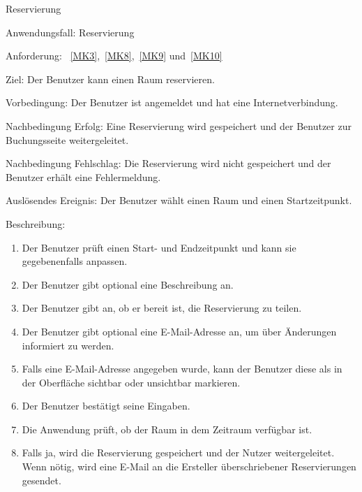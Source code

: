 \begin{function}{30}{Reservierung}
    \item[Anwendungsfall:] Reservierung
    \item[Anforderung:]~\ref{MK3},~\ref{MK8},~\ref{MK9} und~\ref{MK10}
    \item[Ziel:] Der Benutzer kann einen Raum reservieren.
    \item[Vorbedingung:] Der Benutzer ist angemeldet und hat eine Internetverbindung.
    \item[Nachbedingung Erfolg:] Eine Reservierung wird gespeichert und der Benutzer zur Buchungsseite weitergeleitet.
    \item[Nachbedingung Fehlschlag:] Die Reservierung wird nicht gespeichert und der Benutzer erhält eine Fehlermeldung.
    \item[Auslösendes Ereignis:] Der Benutzer wählt einen Raum und einen Startzeitpunkt.
    \item[Beschreibung:] ~
    \begin{enumerate}
        \item Der Benutzer prüft einen Start- und Endzeitpunkt und kann sie gegebenenfalls anpassen.
        \item Der Benutzer gibt optional eine Beschreibung an.
        \item Der Benutzer gibt an, ob er bereit ist, die Reservierung zu teilen.
        \item Der Benutzer gibt optional eine E-Mail-Adresse an, um über Änderungen informiert zu werden.
        \item Falls eine E-Mail-Adresse angegeben wurde, kann der Benutzer diese als in der Oberfläche sichtbar oder unsichtbar markieren.
        \item Der Benutzer bestätigt seine Eingaben.
        \item Die Anwendung prüft, ob der Raum in dem Zeitraum verfügbar ist.
        \item Falls ja, wird die Reservierung gespeichert und der Nutzer weitergeleitet.
              Wenn nötig, wird eine E-Mail an die Ersteller überschriebener Reservierungen gesendet.
    \end{enumerate}
\end{function}

\pagebreak

